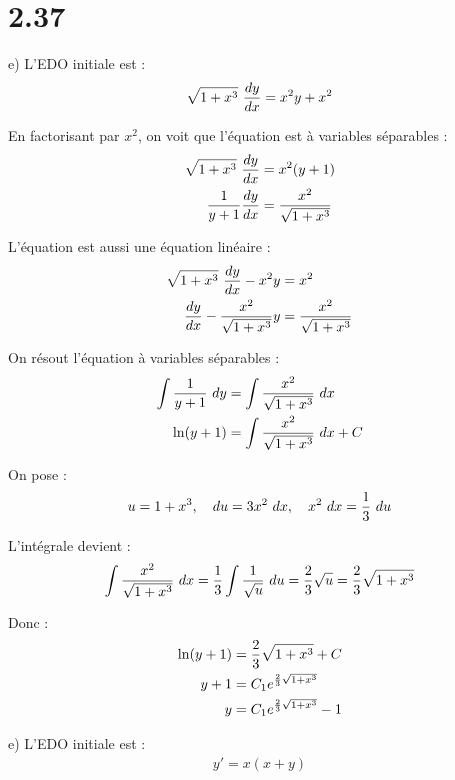 \section*{2.37}

e) L'EDO initiale est :
\begin{align*}
    \sqrt{1 + x^3}\ \dfrac{d y}{d x} = x^2 y + x^2
\end{align*}

En factorisant par $x^2$, on voit que l'équation est à variables séparables :
\begin{align*}
    \sqrt{1 + x^3}\ \dfrac{d y}{d x} &= x^2(y + 1) \\
    \dfrac{1}{y+1}\dfrac{d y}{d x} &= \dfrac{x^2}{\sqrt{1 + x^3}}
\end{align*}

L'équation est aussi une équation linéaire :
\begin{align*}
    \sqrt{1 + x^3}\ \dfrac{d y}{d x} -x^2 y &= x^2 \\
    \dfrac{d y}{d x} -\dfrac{x^2}{\sqrt{1 + x^3}}y &= \dfrac{x^2}{\sqrt{1 + x^3}}
\end{align*}

On résout l'équation à variables séparables :
\begin{align*}
    \int{\dfrac{1}{y+1}\ dy} &= \int{\dfrac{x^2}{\sqrt{1 + x^3}}\ dx} \\
    \ln(y+1) &= \int{\dfrac{x^2}{\sqrt{1 + x^3}}\ dx} +C \\
\end{align*}

On pose :
\begin{align*}
    u = 1+x^3,\quad du = 3x^2\ dx,\quad x^2\ dx = \dfrac{1}{3}\ du
\end{align*}

L'intégrale devient :
\begin{align*}
    \int{\dfrac{x^2}{\sqrt{1 + x^3}}\ dx} &= \dfrac{1}{3}\int{\dfrac{1}{\sqrt{u}}\ du} =
    \dfrac{2}{3}\sqrt{u} = \dfrac{2}{3}\sqrt{1+x^3}\\
\end{align*}

Donc :
\begin{align*}
    \ln(y+1) &= \dfrac{2}{3}\sqrt{1+x^3} +C \\
    y+1 &= C_1 e^{\frac{2}{3}\sqrt{1+x^3}} \\
    y &= C_1 e^{\frac{2}{3}\sqrt{1+x^3}} - 1
\end{align*}

e) L'EDO initiale est :
\begin{align*}
    y' = x(x+y)
\end{align*}

